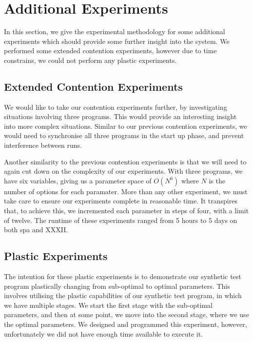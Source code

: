 \section{Additional Experiments}
\label{section:experimental_methodology:additional_experiments}

In this section, we give the experimental methodology for some additional experiments which should provide some further insight into the system. We performed some extended contention experiments, however due to time constrains, we could not perform any plastic experiments.



\subsection{Extended Contention Experiments}
\label{section:experimental_methodology:extended_contention_experiments}

We would like to take our contention experiments further, by investigating situations involving three programs. This would provide an interesting insight into more complex situations. Similar to our previous contention experiments, we would need to synchronise all three programs in the start up phase, and prevent interference between runs. 

Another similarity to the previous contention experiments is that we will need to again cut down on the complexity of our experiments. With three programs, we have six variables, giving us a parameter space of $O(N^6)$ where $N$ is the number of options for each paramater. More than any other experiment, we must take care to ensure our experiments complete in reasonable time. It transpires that, to achieve this, we incremented each parameter in steps of four, with a limit of twelve. The runtime of these experiments ranged from 5 hours to 5 days on both spa and XXXII.



\subsection{Plastic Experiments}
\label{section:experimental_methodology:plastic_experiment}

The intention for these plastic experiments is to demonstrate our synthetic test program plastically changing from sub-optimal to optimal parameters. This involves utilising the plastic capabilities of our synthetic test program, in which we have multiple stages. We start the first stage with the sub-optimal parameters, and then at some point, we move into the second stage, where we use the optimal parameters. We designed and programmed this experiment, however, unfortunately we did not have enough time available to execute it.



